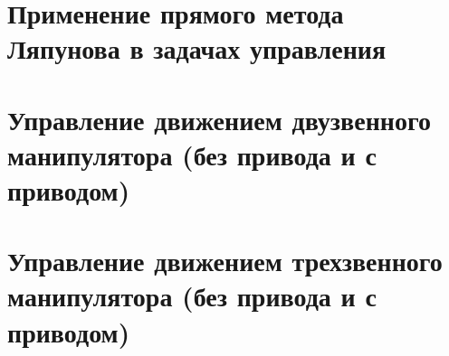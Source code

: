 \documentclass[14pt,a4paper,final,russian]{report}
\numberwithin{theorem}{chapter}
\numberwithin{lemma}{chapter}
\numberwithin{consectary}{chapter}
\numberwithin{pointout}{chapter}
\numberwithin{definition}{chapter}
\begin{document}
	\vglue 0.5cm
	
	\dotfill\mbox{\ \ \pageref{postfix}} \vglue 0.5cm
	
	 \dotfill\mbox{\ \ \pageref{bibl}}
	\par \vglue 0.5cm
	 \dotfill\mbox{\ \ \pageref{app1start}}
	
	\newpage
	
	\fontsize{14pt}{21pt}\selectfont
	
	
	
	\chapter{Применение прямого метода Ляпунова в задачах управления}
	
	
	 
	
	\chapter{Управление движением двузвенного манипулятора (без привода и с приводом)}
	
	
	 
	
	\chapter{Управление движением трехзвенного манипулятора (без привода и с приводом)}
	
	
	 
	
	
	
	
	
	
\end{document}
